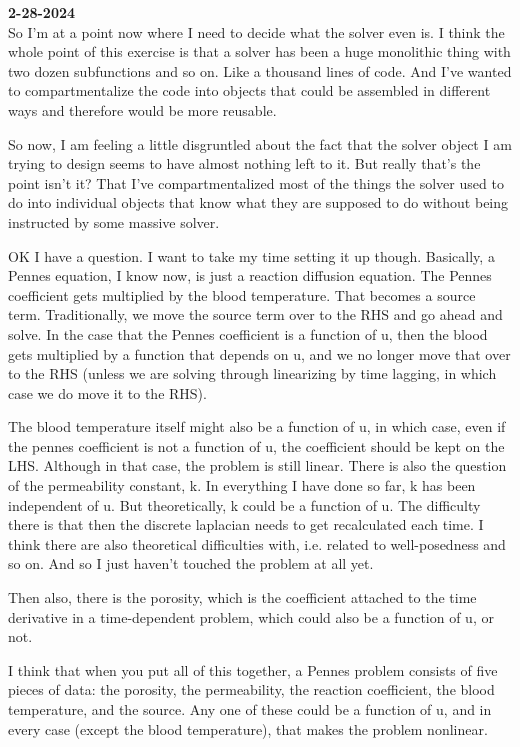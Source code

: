\documentclass{amsart}
\begin{document}
\textbf{2-28-2024} \\
So I'm at a point now where I need to decide what the solver even is. I think
the whole point of this exercise is that a solver has been a huge monolithic
thing with two dozen subfunctions and so on. Like a thousand lines of code. And
I've wanted to compartmentalize the code into objects that could be assembled
in different ways and therefore would be more reusable. 

So now, I am feeling a little disgruntled about the fact that the solver object
I am trying to design seems to have almost nothing left to it. But really
that's the point isn't it? That I've compartmentalized most of the things the
solver used to do into individual objects that know what they are supposed to
do without being instructed by some massive solver. 

OK I have a question. I want to take my time setting it up though. Basically, a
Pennes equation, I know now, is just a reaction diffusion equation. The Pennes
coefficient gets multiplied by the blood temperature. That becomes a source
term. Traditionally, we move the source term over to the RHS and go ahead and
solve. In the case that the Pennes coefficient is a function of u, then the
blood gets multiplied by a function that depends on u, and we no longer move
that over to the RHS (unless we are solving through linearizing by time
lagging, in which case we do move it to the RHS). 

The blood temperature itself might also be a function of u, in which case, even
if the pennes coefficient is not a function of u, the coefficient should be
kept on the LHS. Although in that case, the problem is still linear. There is
also the question of the permeability constant, k. In everything I have done so
far, k has been independent of u. But theoretically, k could be a function of
u. The difficulty there is that then the discrete laplacian needs to get
recalculated each time. I think there are also theoretical difficulties with,
i.e. related to well-posedness and so on. And so I just haven't touched the
problem at all yet. 

Then also, there is the porosity, which is the coefficient attached to the time
derivative in a time-dependent problem, which could also be a function of u, or
not. 

I think that when you put all of this together, a Pennes problem consists of
five pieces of data: the porosity, the permeability, the reaction coefficient,
the blood temperature, and the source. Any one of these could be a function of
u, and in every case (except the blood temperature), that makes the problem
nonlinear.
\end{document}
